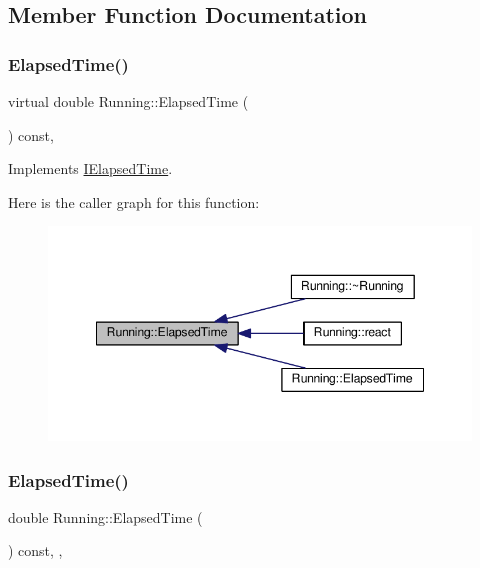 \subsection{Member Function Documentation}
\mbox{\label{struct_running_ac9d1d116f030428827757e3a5289d94a}} 
\subsubsection{\texorpdfstring{Elapsed\+Time()}{ElapsedTime()}\hspace{0.1cm}{\footnotesize\ttfamily [1/2]}}
{\footnotesize\ttfamily virtual double Running\+::\+Elapsed\+Time (\begin{DoxyParamCaption}{ }\end{DoxyParamCaption}) const\hspace{0.3cm}{\ttfamily [inline]}, {\ttfamily [virtual]}}



Implements \mbox{\hyperlink{struct_i_elapsed_time_a11995710009caacf4343d6d0f79da4ce}{I\+Elapsed\+Time}}.

Here is the caller graph for this function\+:
\nopagebreak
\begin{figure}[H]
\begin{center}
\leavevmode
\includegraphics[width=348pt]{struct_running_ac9d1d116f030428827757e3a5289d94a_icgraph}
\end{center}
\end{figure}
\mbox{\label{struct_running_a5320a8463f61e5ab96008bc218bb9f68}} 
\subsubsection{\texorpdfstring{Elapsed\+Time()}{ElapsedTime()}\hspace{0.1cm}{\footnotesize\ttfamily [2/2]}}
{\footnotesize\ttfamily double Running\+::\+Elapsed\+Time (\begin{DoxyParamCaption}{ }\end{DoxyParamCaption}) const\hspace{0.3cm}{\ttfamily [inline]}, {\ttfamily [private]}, {\ttfamily [virtual]}}



